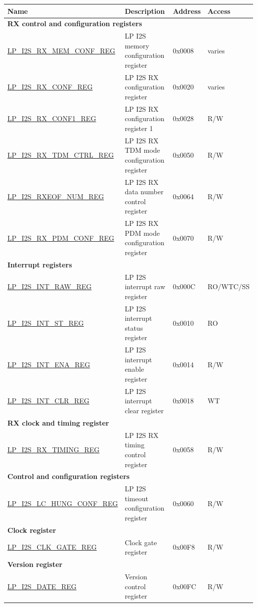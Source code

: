 \begin{longtable}{ | p{5.5cm} | p{6.7cm} | p{1.3cm} | p{2cm} | }
\hline\rowcolor{lightgray}
\textbf{Name} & \textbf{Description} &  \textbf{Address} & \textbf{Access} \\ \hline
\endhead
\multicolumn{4}{|l|}{\textbf{RX control and configuration registers}} \\ \hline
\hyperref[regdesc:LPI2SRXMEMCONFREG]{LP\_I2S\_RX\_MEM\_CONF\_REG} & LP I2S memory configuration register & 0x0008 & varies \\ \hline
\hyperref[regdesc:LPI2SRXCONFREG]{LP\_I2S\_RX\_CONF\_REG} & LP I2S RX configuration register & 0x0020 & varies \\ \hline
\hyperref[regdesc:LPI2SRXCONF1REG]{LP\_I2S\_RX\_CONF1\_REG} & LP I2S RX configuration register 1 & 0x0028 & R/W \\ \hline
\hyperref[regdesc:LPI2SRXTDMCTRLREG]{LP\_I2S\_RX\_TDM\_CTRL\_REG} & LP I2S RX TDM mode configuration register& 0x0050 & R/W \\ \hline
\hyperref[regdesc:LPI2SRXEOFNUMREG]{LP\_I2S\_RXEOF\_NUM\_REG} & LP I2S RX data number control register & 0x0064 & R/W \\ \hline
\hyperref[regdesc:LPI2SRXPDMCONFREG]{LP\_I2S\_RX\_PDM\_CONF\_REG} & LP I2S RX PDM mode configuration register & 0x0070 & R/W \\ \hline
\multicolumn{4}{|l|}{\textbf{Interrupt registers}} \\ \hline
\hyperref[regdesc:LPI2SINTRAWREG]{LP\_I2S\_INT\_RAW\_REG} & LP I2S interrupt raw register & 0x000C & RO/WTC/SS \\ \hline
\hyperref[regdesc:LPI2SINTSTREG]{LP\_I2S\_INT\_ST\_REG} & LP I2S interrupt status register & 0x0010 & RO \\ \hline
\hyperref[regdesc:LPI2SINTENAREG]{LP\_I2S\_INT\_ENA\_REG} & LP I2S interrupt enable register & 0x0014 & R/W \\ \hline
\hyperref[regdesc:LPI2SINTCLRREG]{LP\_I2S\_INT\_CLR\_REG} & LP I2S interrupt clear register & 0x0018 & WT \\ \hline
\multicolumn{4}{|l|}{\textbf{RX clock and timing register}} \\ \hline
\hyperref[regdesc:LPI2SRXTIMINGREG]{LP\_I2S\_RX\_TIMING\_REG} & LP I2S RX timing control register & 0x0058 & R/W \\ \hline
\multicolumn{4}{|l|}{\textbf{Control and configuration registers}} \\ \hline
\hyperref[regdesc:LPI2SLCHUNGCONFREG]{LP\_I2S\_LC\_HUNG\_CONF\_REG} & LP I2S timeout configuration register & 0x0060 & R/W \\ \hline
\multicolumn{4}{|l|}{\textbf{Clock register}} \\ \hline
\hyperref[regdesc:LPI2SCLKGATEREG]{LP\_I2S\_CLK\_GATE\_REG} & Clock gate register & 0x00F8 & R/W \\ \hline
\multicolumn{4}{|l|}{\textbf{Version register}} \\ \hline
\hyperref[regdesc:LPI2SDATEREG]{LP\_I2S\_DATE\_REG} & Version control register & 0x00FC & R/W \\ \hline
\end{longtable}
